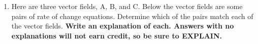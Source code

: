 \begin{enumerate}
\item Here are three vector fields, A, B, and C. Below the vector fields are some pairs of rate of change equations. Determine which of the pairs match each of the vector fields. \textbf{Write an explanation of each. Answers with no explanations will not earn credit, so be sure to EXPLAIN.} \label{09HWproblem4}
\end{enumerate}
